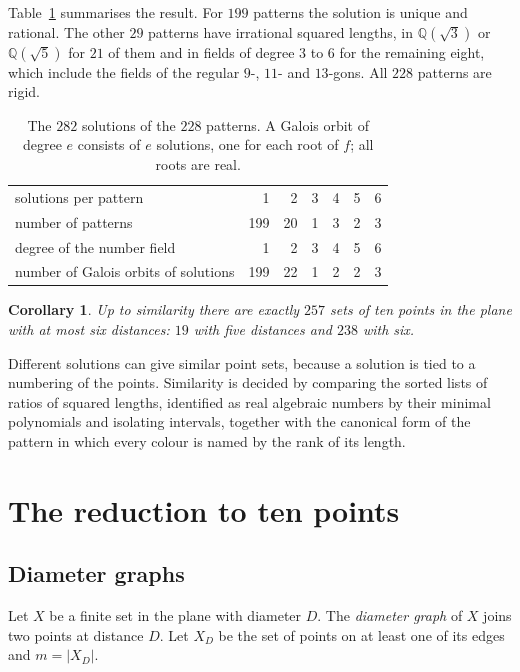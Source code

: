 \documentclass[11pt]{amsart}
\newtheorem{corollary}[theorem]{Corollary}
\theoremstyle{definition}
\theoremstyle{remark}
\newcommand{\Q}{\mathbb{Q}}
\begin{document}
Table~\ref{tab:solutions} summarises the result. For $199$ patterns the solution is unique and rational.
The other $29$ patterns have irrational squared lengths, in $\Q(\sqrt3)$ or $\Q(\sqrt5)$ for $21$ of them
and in fields of degree $3$ to $6$ for the remaining eight, which include the fields of the regular
$9$-, $11$- and $13$-gons. All $228$ patterns are rigid.

\begin{table}[ht]
\centering
\begin{tabular}{@{}lrrrrrr@{}}
\toprule
solutions per pattern & 1 & 2 & 3 & 4 & 5 & 6\\
number of patterns & 199 & 20 & 1 & 3 & 2 & 3\\
\midrule
degree of the number field & 1 & 2 & 3 & 4 & 5 & 6\\
number of Galois orbits of solutions & 199 & 22 & 1 & 2 & 2 & 3\\
\bottomrule
\end{tabular}
\caption{The $282$ solutions of the $228$ patterns. A Galois orbit of degree $e$ consists of $e$ solutions,
one for each root of $f$; all roots are real.}
\label{tab:solutions}
\end{table}

\begin{corollary}\label{cor:257}
Up to similarity there are exactly $257$ sets of ten points in the plane with at most six distances:
$19$ with five distances and $238$ with six.
\end{corollary}

Different solutions can give similar point sets, because a solution is tied to a numbering of the points.
Similarity is decided by comparing the sorted lists of ratios of squared lengths, identified as real
algebraic numbers by their minimal polynomials and isolating intervals, together with the canonical form
of the pattern in which every colour is named by the rank of its length.

\section{The reduction to ten points}\label{sec:reduction}

\subsection{Diameter graphs}
Let $X$ be a finite set in the plane with diameter $D$. The \emph{diameter graph} of $X$ joins two points at
distance $D$. Let $X_D$ be the set of points on at least one of its edges and $m=|X_D|$.
\end{document}
